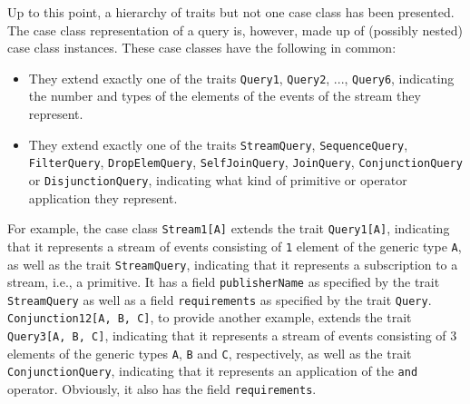 \documentclass[article, 10pt, type=bsc, colorback, accentcolor=tud8b, parskip=half, bibliography=totocnumbered]{tudthesis}
\begin{document}
Up to this point, a hierarchy of traits but not one case class has been presented.
The case class representation of a query is, however, made up of (possibly nested) case class instances.
These case classes have the following in common:

\begin{itemize}
\item
They extend exactly one of the traits \lstinline{Query1}, \lstinline{Query2}, ..., \lstinline{Query6}, indicating the number and types of the elements of the events of the stream they represent.
\item
They extend exactly one of the traits \lstinline{StreamQuery}, \lstinline{SequenceQuery}, \lstinline{FilterQuery}, \lstinline{DropElemQuery}, \lstinline{SelfJoinQuery}, \lstinline{JoinQuery}, \lstinline{ConjunctionQuery} or \lstinline{DisjunctionQuery}, indicating what kind of primitive or operator application they represent.
\end{itemize}

For example, the case class \lstinline{Stream1[A]} extends the trait \lstinline{Query1[A]}, indicating that it represents a stream of events consisting of \lstinline{1} element of the generic type \lstinline{A}, as well as the trait \lstinline{StreamQuery}, indicating that it represents a subscription to a stream, i.e., a primitive.
It has a field \lstinline{publisherName} as specified by the trait \lstinline{StreamQuery} as well as a field \lstinline{requirements} as specified by the trait \lstinline{Query}.
\lstinline{Conjunction12[A, B, C]}, to provide another example, extends the trait \lstinline{Query3[A, B, C]}, indicating that it represents a stream of events consisting of 3 elements of the generic types \lstinline{A}, \lstinline{B} and \lstinline{C}, respectively, as well as the trait \lstinline{ConjunctionQuery}, indicating that it represents an application of the \lstinline{and} operator.
Obviously, it also has the field \lstinline{requirements}.
\end{document}
